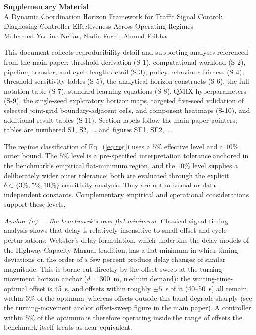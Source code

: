 \documentclass[12pt]{article}
\newcommand{\suppsec}[1]{%
  \bigskip\par\noindent{\large\bfseries #1}\par\medskip}
\begin{document}
\begin{center}
{\Large\bfseries Supplementary Material}\\[4pt]
{\large A Dynamic Coordination Horizon Framework for Traffic Signal Control: Diagnosing Controller Effectiveness Across Operating Regimes}\\[6pt]
Mohamed Yassine Neifar, Nadir Farhi, Ahmed Frikha
\end{center}

\bigskip
This document collects reproducibility detail and supporting analyses referenced
from the main paper: threshold derivation (S-1), computational workload (S-2),
pipeline, transfer, and cycle-length detail (S-3), policy-behaviour fairness (S-4),
threshold-sensitivity tables (S-5), the analytical horizon constructs (S-6), the
full notation table (S-7), standard learning equations (S-8), QMIX hyperparameters
(S-9), the single-seed exploratory horizon maps, targeted five-seed validation
of selected joint-grid boundary-adjacent cells, and component heatmaps (S-10),
and additional result tables (S-11).
Section labels follow the main-paper pointers; tables are numbered S1, S2,~\ldots
and figures SF1, SF2,~\ldots

\suppsec{S-1\quad Derivation of the effectiveness thresholds}

The regime classification of Eq.~(\ref{eq:reg}) uses a $5\%$ effective level and a
$10\%$ outer bound. The $5\%$ level is a pre-specified interpretation tolerance
anchored in the benchmark's empirical flat-minimum region, and the $10\%$ level
supplies a deliberately wider outer tolerance; both are evaluated through the
explicit $\delta\in\{3\%,5\%,10\%\}$ sensitivity analysis. They are not
universal or data-independent constants.
Complementary empirical and operational considerations support these levels.

\textit{Anchor (a) --- the benchmark's own flat minimum.} Classical signal-timing
analysis shows that delay is relatively insensitive to small offset and cycle
perturbations: Webster's delay formulation, which underpins the delay models of the
Highway Capacity Manual tradition, has a flat minimum in which timing deviations on
the order of a few percent produce delay changes of similar magnitude. This is borne out directly by the offset sweep at the turning-movement horizon
anchor ($d=300$~m, medium demand): the waiting-time-optimal offset is 45~s,
and offsets within roughly $\pm5$~s of it (40--50~s) all remain within
5\% of the optimum, whereas offsets outside this band degrade sharply
(see the turning-movement anchor offset-sweep figure in the main paper). A controller within
$5\%$ of the optimum is therefore operating inside the range of offsets the benchmark
itself treats as near-equivalent.
\end{document}
